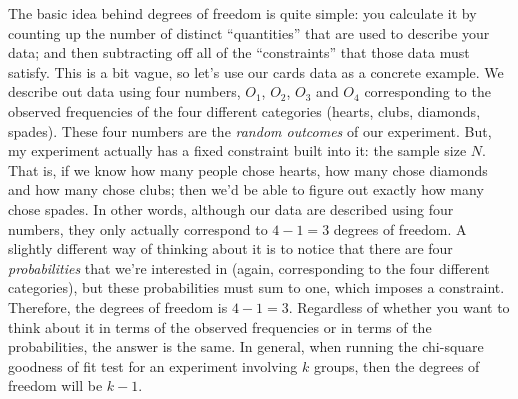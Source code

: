 The basic idea behind degrees of freedom is quite simple: you calculate it by counting up the number of distinct ``quantities'' that are used to describe your data; and then subtracting off all of the ``constraints'' that those data must satisfy. This is a bit vague, so let's use our cards data as a concrete example. We describe out data using four numbers, $O_1$, $O_2$, $O_3$ and $O_4$ corresponding to the observed frequencies of the four different categories (hearts, clubs, diamonds, spades). These four numbers are the {\it random outcomes} of our experiment. But, my experiment actually has a fixed constraint built into it: the sample size $N$. That is, if we know how many people chose hearts, how many chose diamonds and how many chose clubs; then we'd be able to figure out exactly how many chose spades. In other words, although our data are described using four numbers, they only actually correspond to $4-1 = 3$ degrees of freedom. A slightly different way of thinking about it is to notice that there are four {\it probabilities} that we're interested in (again, corresponding to the four different categories), but these probabilities must sum to one, which imposes a constraint. Therefore, the degrees of freedom is $4-1 = 3$. Regardless of whether you want to think about it in terms of the observed frequencies or in terms of the probabilities, the answer is the same. In general, when running the chi-square goodness of fit test for an experiment involving $k$ groups, then the degrees of freedom will be $k-1$.


